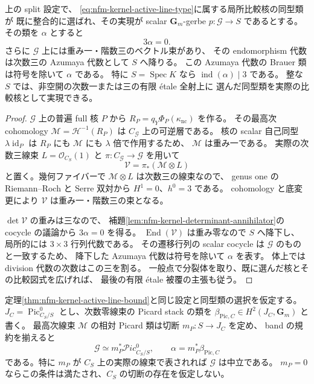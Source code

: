 \begin{theorem}
\label{thm:nfm-kernel-active-line-bound}
上の split 設定で、
\eqref{eq:nfm-kernel-active-line-type}に属する局所比較核の同型類が
既に整合的に選ばれ、その実現が scalar $\mathbf G_m$-gerbe
$p:\mathcal G\to S$ であるとする。
その類を $\alpha$ とすると
\[
 3\alpha=0.
\]
さらに $\mathcal G$ 上には重み一・階数三のベクトル束があり、
その endomorphism 代数は次数三の Azumaya 代数として $S$ へ降りる。
この Azumaya 代数の Brauer 類は符号を除いて $\alpha$ である。
特に $S=\operatorname{Spec}K$ なら
$\operatorname{ind}(\alpha)\mid3$ である。
整な $S$ では、非空開の次数一または三の有限 étale 全射上に
選んだ同型類を実際の比較核として実現できる。
\end{theorem}

\begin{proof}
$\mathcal G$ 上の普遍 full 核 $P$ から
$R_P=q_Y\Phi_P(\kappa_{\mathrm{nc}})$ を作る。
その最高次 cohomology
$\mathcal M=\mathcal H^{-1}(R_P)$ は $C_{\mathcal G}$ 上の可逆層である。
核の scalar 自己同型 $\lambda\operatorname{id}_P$ は
$R_P$ にも $\mathcal M$ にも $\lambda$ 倍で作用するため、
$\mathcal M$ は重み一である。
実際の次数三線束 $L=\mathcal O_{C_S}(1)$ と
$\pi:C_{\mathcal G}\to\mathcal G$ を用いて
\begin{equation}
\label{eq:nfm-kernel-active-rank-three}
 \mathcal V=\pi_*(\mathcal M\otimes L)
\end{equation}
と置く。幾何ファイバーで $\mathcal M\otimes L$ は次数三の線束なので、
genus one の Riemann--Roch と Serre 双対から $H^1=0$、$h^0=3$ である。
cohomology と底変更により $\mathcal V$ は重み一・階数三の束となる。

$\det\mathcal V$ の重みは三なので、
補題\ref{lem:nfm-kernel-determinant-annihilator}の cocycle の議論から
$3\alpha=0$ を得る。
$\operatorname{End}(\mathcal V)$ は重み零なので $S$ へ降下し、
局所的には $3\times3$ 行列代数である。
その遷移行列の scalar cocycle は $\mathcal G$ のものと一致するため、
降下した Azumaya 代数は符号を除いて $\alpha$ を表す。
体上では division 代数の次数はこの三を割る。
一般点で分裂体を取り、既に選んだ核とその比較図式を広げれば、
最後の有限 étale 被覆の主張も従う。
\end{proof}

\begin{corollary}
\label{cor:nfm-kernel-picard-obstruction}
定理\ref{thm:nfm-kernel-active-line-bound}と同じ設定と同型類の選択を仮定する。
$J_C=\operatorname{Pic}^0_{C_S/S}$ とし、次数零線束の Picard stack の類を
$\beta_{\mathrm{Pic},C}\in H^2(J_C,\mathbf G_m)$ と書く。
最高次線束 $\mathcal M$ の相対 Picard 類は切断 $m_P:S\to J_C$ を定め、
band の規約を揃えると
\[
 \mathcal G\simeq m_P^*\mathscr{P}ic^0_{C_S/S},\qquad
 \alpha=m_P^*\beta_{\mathrm{Pic},C}
\]
である。特に $m_P$ が $C_S$ 上の実際の線束で表されれば $\mathcal G$ は中立である。
$m_P=0$ ならこの条件は満たされ、$C_S$ の切断の存在を仮定しない。
\end{corollary}

